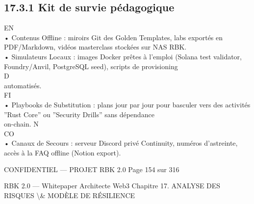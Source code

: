\documentclass[12pt,landscape,a4paper]{article}
\newenvironment{confidential}
{\begin{tcolorbox}[
    colback=rbkred!5!white,
    colframe=rbkred!75!black,
    title=CONFIDENTIEL,
    fonttitle=\bfseries\color{white},
    coltitle=rbkred!75!black,
    breakable,
    enhanced,
    frame hidden,
    borderline west={2pt}{0pt}{rbkred!75!black}
]}
{\end{tcolorbox}}
\begin{document}
\subsection{17.3.1 Kit de survie pédagogique}
\vspace{0.5em}
\vspace{0.5em}
\vspace{0.5em}
\vspace{0.5em}
EN\\
• Contenus Offline : miroirs Git des Golden Templates, labs exportés en PDF/Markdown, vidéos masterclass stockées sur NAS RBK.\\
\vspace{0.5em}
• Simulateurs Locaux : images Docker prêtes à l’emploi (Solana test validator, Foundry/Anvil, PostgreSQL seed), scripts de provisioning\\
\vspace{0.5em}
\vspace{0.5em}
\vspace{0.5em}
\vspace{0.5em}
D\\
automatisés.\\
\vspace{0.5em}
\vspace{0.5em}
\vspace{0.5em}
\vspace{0.5em}
FI\\
• Playbooks de Substitution : plans jour par jour pour basculer vers des activités ”Rust Core” ou ”Security Drills” sans dépendance\\
on-chain.                                      N\\
CO\\
• Canaux de Secours : serveur Discord privé Continuity, numéros d’astreinte, accès à la FAQ offline (Notion export).\\
\vspace{0.5em}
\vspace{0.5em}
\vspace{0.5em}
\vspace{0.5em}
\begin{confidential}CONFIDENTIEL — PROJET RBK 2.0                                Page 154 sur 316\end{confidential}
RBK 2.0 — Whitepaper Architecte Web3                                            Chapitre 17. ANALYSE DES RISQUES \textbackslash{}& MODÈLE DE RÉSILIENCE\\
\vspace{0.5em}
\vspace{0.5em}
\end{document}
